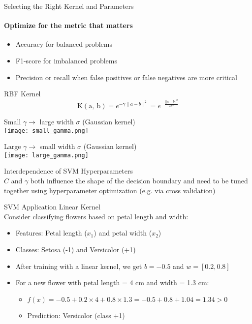 \begin{KR}{Selecting the Right Kernel and Parameters}
\paragraph{Optimize for the metric that matters}
\begin{itemize}
    \item Accuracy for balanced problems
    \item F1-score for imbalanced problems
    \item Precision or recall when false positives or false negatives are more critical
\end{itemize}
\end{KR}

\begin{definition}{RBF Kernel}
    \[ \mathrm{K}(\mathrm{a}, \mathrm{~b}) = e^{-\gamma\|a-b\|^2} = e^{-\frac{||a-b||^2}{2\sigma^2}} \]
    
    \begin{minipage}{0.5\linewidth}
    Small $\gamma \rightarrow$ large width $\sigma$ (Gaussian kernel)\\
    \texttt{[image: small\_gamma.png]}
    \end{minipage}
    \begin{minipage}{0.5\linewidth}
    Large $\gamma \rightarrow$ small width $\sigma$ (Gaussian kernel)\\
    \texttt{[image: large\_gamma.png]}
    \end{minipage}
\end{definition}

\begin{theorem}{Interdependence of SVM Hyperparameters}\\
    $C$ and $\gamma$ both influence the shape of the decision boundary and need to be tuned together 
    using hyperparameter optimization (e.g. via cross validation)
\end{theorem}

\begin{example}{SVM Application} Linear Kernel\\
Consider classifying flowers based on petal length and width:
\begin{itemize}
    \item Features: Petal length ($x_1$) and petal width ($x_2$)
    \item Classes: Setosa (-1) and Versicolor (+1)
    \item After training with a linear kernel, we get $b = -0.5$ and $w = [0.2, 0.8]$
    \item For a new flower with petal length = 4 cm and width = 1.3 cm:
    \begin{itemize}
        \item $f(x) = -0.5 + 0.2 \times 4 + 0.8 \times 1.3 = -0.5 + 0.8 + 1.04 = 1.34 > 0$
        \item Prediction: Versicolor (class +1)
    \end{itemize}
\end{itemize}
\end{example}

